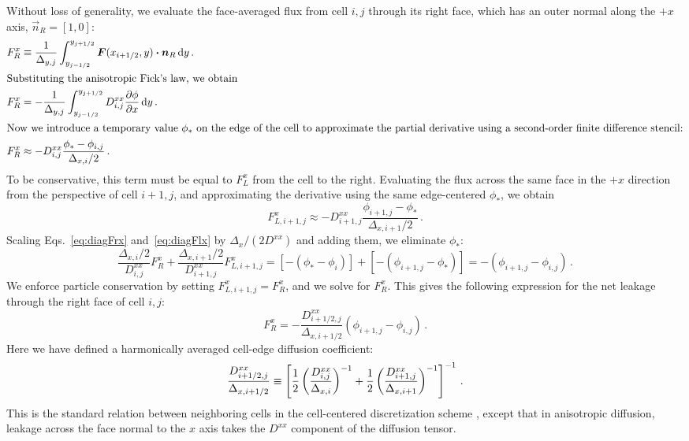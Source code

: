 Without loss of generality, we evaluate the face-averaged flux from cell
$i,j$ through its right face, which has an outer normal along the $+x$ axis,
$\vec{n}_R = [1,0]$:
\begin{align} \nonumber
  F_R^x &\equiv \frac{1}{\Delta_{y,j}} \int_{y_{j-1/2}}^{y_{j+1/2}}
  \bm{F}(x_{i+1/2}, y) \bm{\cdot} \bm{n}_R \mathop{}\!\mathrm{d} y\,.
  \\
  \intertext{Substituting the anisotropic Fick's law, we obtain} \nonumber
  F_R^x &= - \frac{1}{\Delta_{y,j}} \int_{y_{j-1/2}}^{y_{j+1/2}}
  D_{i,j}^{xx} \frac{\partial \phi}{\partial x} \mathop{}\!\mathrm{d} y \,.
  \\ 
  \intertext{Now we introduce a temporary value $\phi_*$ on the edge of the cell
    to
  approximate the partial derivative using a second-order finite difference
  stencil:}
  \label{eq:diagFrx}
  F_R^x &\approx - 
  D_{i,j}^{xx} \frac{\phi_* - \phi_{i,j}}{\Delta_{x,i}/2} \,.
\end{align}
To be conservative, this term must be equal to $F_L^x$ from the cell to
the right. Evaluating the flux across the same face in the $+x$ direction
from the perspective of cell $i+1,j$, and approximating the derivative using the
same edge-centered $\phi_*$, we obtain
\begin{equation}\label{eq:diagFlx}
  F_{L,i+1,j}^x \approx - 
  D_{i+1,j}^{xx} \frac{\phi_{i+1,j} - \phi_*}{\Delta_{x,i+1}/2} \,.
\end{equation}
Scaling Eqs.~\eqref{eq:diagFrx} and~\eqref{eq:diagFlx} by $\Delta_x/(2 D^{xx})$
and adding them, we eliminate $\phi_*$:
\begin{equation*}
  \frac{\Delta_{x,i}/2}{D_{i,j}^{xx}}F_R^x
 + \frac{\Delta_{x,i+1}/2}{D_{i+1,j}^{xx}}F_{L,i+1,j}^x
 = \left[ -(\phi_* - \phi_{i}) \right] + \left[ -(\phi_{i+1,j} - \phi_*)
   \right]
   = -\left( \phi_{i+1,j} - \phi_{i,j} \right) \,.
\end{equation*}
We enforce particle conservation by setting $F_{L,i+1,j}^x = F_R^x$, and we
solve for $F_R^x$. This
gives the following expression for the net leakage through the right face of
cell $i,j$:
\begin{equation}\label{eq:diagF}
  F_R^x= -\frac{D^{xx}_{i+1/2,j}}{\Delta_{x,i+1/2}}
  \left( \phi_{i+1,j} - \phi_{i,j} \right)\,.
\end{equation}
Here we have defined a harmonically averaged cell-edge diffusion coefficient:
\begin{equation} \label{eq:cellEdgeDHarmonic}
  \frac{D^{xx}_{i+1/2,j}}{\Delta_{x,i+1/2}} \equiv \left[
  \frac12 \left( \frac{D^{xx}_{i,j}}{\Delta_{x,i}} \right)^{-1}
 + \frac12 \left( \frac{D^{xx}_{i+1,j}}{\Delta_{x,i+1}} \right)^{-1}
  \right]^{-1}\,.
\end{equation}
This is the standard relation between neighboring cells in the
cell-centered discretization scheme \cite{Dud1976}, except that in anisotropic
diffusion, leakage across the face normal to the $x$ axis takes the $D^{xx}$
component of the diffusion tensor.

